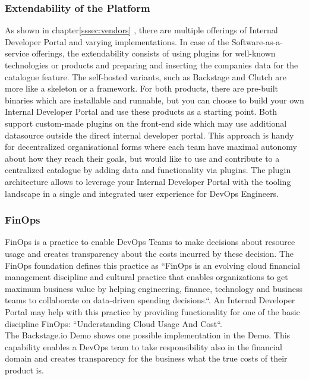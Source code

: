\documentclass[a4paper,12pt]{article}
\begin{document}
    \subsubsection{Extendability of the Platform}
    \label{sssec:extendability}
    As shown in chapter\ref{sssec:vendors} , there are multiple offerings of Internal Developer Portal and varying
    implementations.
    In case of the Software-as-a-service offerings, the extendability consists of using plugins for well-known
    technologies or products and preparing and inserting the companies data for the catalogue feature.
    The self-hosted variants, such as Backstage and Clutch are more like a skeleton or a framework.
    For both products, there are pre-built binaries which are installable and runnable, but you can choose to build your
    own Internal Developer Portal and use these products as a starting point.
    Both support custom-made plugins on the front-end side which may use additional datasource outside the direct
    internal developer portal.
    This approach is handy for decentralized organisational forms where each team have maximal autonomy about how they
    reach their goals, but would like to use and contribute to a centralized catalogue by adding data and functionality
    via plugins.
    The plugin architecture allows to leverage your Internal Developer Portal with the tooling landscape in a
    single and integrated user experience for DevOps Engineers.

    \subsubsection{FinOps}
    \label{sssec:finops}
    FinOps is a practice to enable DevOps Teams to make decisions about resource usage and creates transparency
    about the costs incurred by these decision.
    The FinOps foundation defines\parencite{finopsdefinition} this practice as ``FinOps is an evolving cloud financial management discipline and
    cultural practice that enables organizations to get maximum business value by helping engineering, finance,
    technology and business teams to collaborate on data-driven spending decisions.``.
    An Internal Developer Portal may help with this practice by providing functionality for one of the basic discipline
    FinOps: ``Understanding Cloud Usage And Cost``.\\
    The Backstage.io Demo shows one possible implementation in the Demo\parencite{backstagedemocost}.
    This capability enables a DevOps team to take responsibility also in the financial domain and creates transparency
    for the business what the true costs of their product is.
\end{document}
